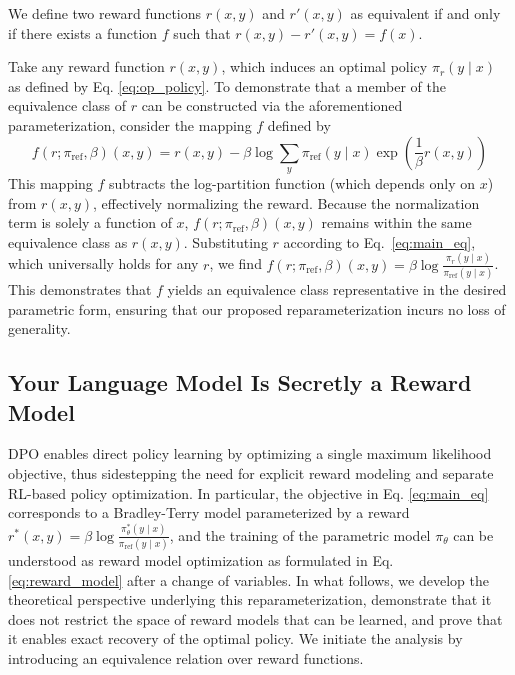 \begin{definition}
We define two reward functions $r(x, y)$ and $r'(x, y)$ as equivalent if and only if there exists a function $f$ such that ${r(x, y)-r'(x, y) = f(x)}$.
\end{definition}

\begin{sproof}
    Take any reward function $r(x, y)$, which induces an optimal policy $\pi_r(y \mid x)$ as defined by Eq. \ref{eq:op_policy}. To demonstrate that a member of the equivalence class of $r$ can be constructed via the aforementioned parameterization, consider the mapping $f$ defined by  
\begin{equation}
    f(r; \pi_\text{ref}, \beta)(x, y) = r(x, y) - \beta\log\sum_{y}\pi_\text{ref}(y\mid x)\exp\left(\frac{1}{\beta}r(x, y)\right)
\end{equation}
This mapping $f$ subtracts the log-partition function (which depends only on $x$) from $r(x, y)$, effectively normalizing the reward. Because the normalization term is solely a function of $x$, $f(r; \pi_\text{ref}, \beta)(x, y)$ remains within the same equivalence class as $r(x, y)$. Substituting $r$ according to Eq.~\ref{eq:main_eq}, which universally holds for any $r$, we find $f(r; \pi_\text{ref}, \beta)(x, y) = \beta \log \frac{\pi_r(y\mid x)}{\pi_\text{ref}(y\mid x)}$. This demonstrates that $f$ yields an equivalence class representative in the desired parametric form, ensuring that our proposed reparameterization incurs no loss of generality.
\end{sproof}

\subsection{Your Language Model Is Secretly a Reward Model} 
DPO enables direct policy learning by optimizing a single maximum likelihood objective, thus sidestepping the need for explicit reward modeling and separate RL-based policy optimization. In particular, the objective in Eq. \ref{eq:main_eq} corresponds to a Bradley-Terry model parameterized by a reward $r^*(x, y) = \beta \log\frac{\pi^*_\theta(y \mid x)}{\pi_\text{ref}(y \mid x)}$, and the training of the parametric model $\pi_\theta$ can be understood as reward model optimization as formulated in Eq. \ref{eq:reward_model} after a change of variables. In what follows, we develop the theoretical perspective underlying this reparameterization, demonstrate that it does not restrict the space of reward models that can be learned, and prove that it enables exact recovery of the optimal policy. We initiate the analysis by introducing an equivalence relation over reward functions.

